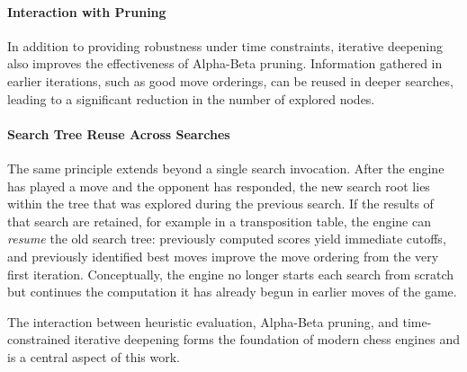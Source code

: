 \paragraph{Interaction with Pruning}
In addition to providing robustness under time constraints, iterative deepening
also improves the effectiveness of Alpha-Beta pruning. Information gathered in
earlier iterations, such as good move orderings, can be reused in deeper searches,
leading to a significant reduction in the number of explored nodes.

\paragraph{Search Tree Reuse Across Searches}
The same principle extends beyond a single search invocation. After the engine
has played a move and the opponent has responded, the new search root lies
within the tree that was explored during the previous search. If the results of
that search are retained, for example in a transposition table, the engine can
\emph{resume} the old search tree: previously computed scores yield immediate
cutoffs, and previously identified best moves improve the move ordering from the
very first iteration. Conceptually, the engine no longer starts each search from
scratch but continues the computation it has already begun in earlier moves of
the game.

The interaction between heuristic evaluation, Alpha-Beta pruning, and
time-constrained iterative deepening forms the foundation of modern chess
engines and is a central aspect of this work.